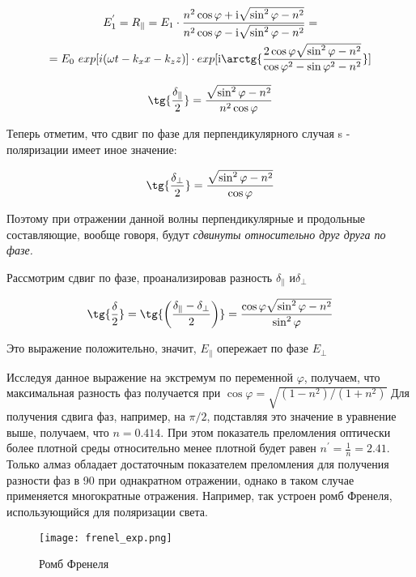 	\begin{multline*}
		E_{1}^{'} =  R_{\parallel} = E_{1} \cdot \frac { n^{2} \cos{ \varphi  + \text{i} \sqrt{\sin^{2}{\varphi}  - n^2}  } } { n^{2} \cos{ \varphi  - \text{i} \sqrt{\sin^{2}{\varphi}  - n^2}  } } = \\ 
		= E_{0} \ exp[ i (\omega t - k_{x} x - k_{z} z)] \cdot exp[\text{i} \arctg{\frac{2 \cos{\varphi}   \sqrt{\sin^{2}{\varphi}  - n^2}   }{\cos{\varphi^{2} - \sin{\varphi}^{2} - n^{2}}}  } ] 
		\end{multline*}
		
		\[ \tg{\frac{\delta_{\parallel}}{2}} = \frac{ \sqrt{\sin^{2}{\varphi}  - n^2}}{n^{2} \cos{\varphi}}\]
	
	Теперь отметим, что сдвиг по фазе для перпендикулярного случая s - поляризации имеет иное значение:
	
		\[ \tg{\frac{\delta_{\perp}}{2}} = \frac{ \sqrt{\sin^{2}{\varphi}  - n^2}}{ \cos{\varphi}}\]
		
		Поэтому при отражении данной волны перпендикулярные и продольные составляющие, вообще говоря, будут \textit{сдвинуты относительно друг друга по фазе.} 
		
		Рассмотрим сдвиг по фазе, проанализировав разность $ \delta_{\parallel} $ и$  \delta_{\perp} $ 
		
		\[ \tg{\frac{\delta}{2}} = \tg{\left( \frac{\delta_{\parallel} - \delta_{\perp}}{2} \right) } = \frac{\cos{\varphi}  \sqrt{\sin^{2}{\varphi}  - n^2} }{ \sin^{2}{\varphi}} \]
		
		Это выражение положительно, значит, \textbf{$E_{\parallel}$}
		опережает по фазе  \textbf{$E_{\perp}$}
		
		Исследуя данное выражение на экстремум по переменной $\varphi$, получаем, что максимальная разность фаз получается при $\cos{\varphi}  = \sqrt{ (1 - n^{2}) / (1 + n^{2})} $
	 	Для получения сдвига фаз, например, на $\pi / 2$, подставляя это значение в уравнение выше, получаем, что $ n = 0.414 $. При этом показатель преломления оптически более плотной среды относительно менее плотной будет равен $n^{'} = \frac{1}{n} = 2.41 $. Только алмаз обладает достаточным показателем преломления для получения разности фаз в 90 при однакратном отражении, однако в таком случае применяется многократные отражения. Например, так устроен ромб Френеля, использующийся для поляризации света.
	 	
	 	\newpage
	 	
	 	\begin{figure}[h]
	 		\centering
	 		\texttt{[image: frenel\_exp.png]}
	 		\caption*{Ромб Френеля}
	 	\end{figure}
 	
